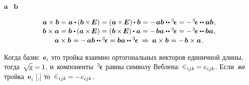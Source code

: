 \begin{otherlanguage}{russian}
 $\bm{a}$ ~$\bm{b}$

\nopagebreak\vspace{-0.2em}\begin{equation}\label{crossproductoftwovectors}
\begin{array}{c}
\bm{a} \times \bm{b} = \bm{a} \dotp \hspace{-0.1ex} \left( \bm{b} \hspace{-0.1ex} \times \hspace{-0.25ex} \bm{E} \right) = \left( \bm{a} \hspace{-0.1ex} \times \hspace{-0.25ex} \bm{E} \right) \hspace{-0.1ex} \dotp \bm{b} = - \hspace{.25ex} \bm{a} \bm{b} \dotdotp \levicivitatensor = - \hspace{.2ex} \levicivitatensor \dotdotp \bm{a} \bm{b} \hspace{.1ex},
\\[.1em]
%
\bm{b} \times \bm{a} = \bm{b} \dotp \hspace{-0.1ex} \left( \bm{a} \hspace{-0.1ex} \times \hspace{-0.25ex} \bm{E} \right) = \left( \bm{b} \hspace{-0.1ex} \times \hspace{-0.25ex} \bm{E} \right)  \hspace{-0.1ex} \dotp \bm{a} = - \hspace{.25ex} \bm{b} \bm{a} \dotdotp \levicivitatensor = - \hspace{.2ex} \levicivitatensor \dotdotp \bm{b} \bm{a} \hspace{.1ex},
\\[.15em]
%
\bm{a} \times \bm{b} \hspace{.16ex} = - \hspace{.25ex} \bm{a} \bm{b} \dotdotp \levicivitatensor = \bm{b} \bm{a} \dotdotp \levicivitatensor
\:\Rightarrow\:
\bm{a} \times \bm{b} \hspace{.16ex} = - \hspace{.25ex} \bm{b} \times \bm{a} \hspace{.2ex}.
\end{array}
\end{equation}

Когда базис~${\bm{e}_i}$ это  тройка взаимно ортогональных векторов единичной длины, тогда~${\sqrt{\hspace{-0.36ex}\mathstrut{\textsl{g}}} = \hspace{-0.1ex} 1}$, и~компоненты~${^3\hspace{-0.25ex}\bm{\epsilon}}\hspace{.05ex}$ равны символу Веблена: ${\levicivita_{ijk} \hspace{-0.2ex} = e_{ijk}}$. Если~же тройка~${\bm{e}_i}$ [,] то~${\levicivita_{ijk} \hspace{-0.2ex} = \hspace{-0.1ex} - \hspace{0.1ex} e_{ijk}}$.


\end{otherlanguage}
